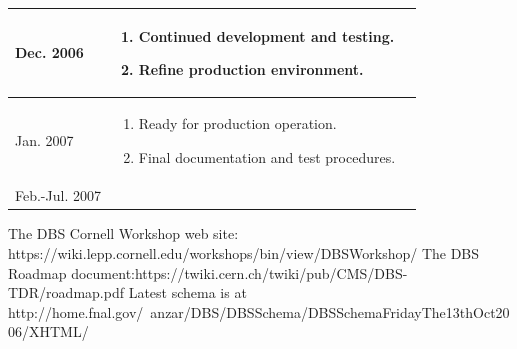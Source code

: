\documentclass{cmspaper}
\begin{document}
\begin{table}[htb]
\begin{center}
\begin{tabular}{|l|p{3.5in}|p{1.5in}|}
Dec. 2006      & \begin{enumerate} \item Continued development and testing. \item Refine production environment.   \end{enumerate} &  \\ \hline
Jan. 2007  & \begin{enumerate} \item Ready for production operation. \item Final documentation and test procedures. \end{enumerate}   &  \\ \hline
Feb.-Jul. 2007 &    &      \\ \hline
      \end{tabular}
    \end{center}
  \end{table}  



\begin{thebibliography}{9}
   {The DBS Cornell Workshop web site: https://wiki.lepp.cornell.edu/workshops/bin/view/DBSWorkshop/}
   {The DBS Roadmap document:https://twiki.cern.ch/twiki/pub/CMS/DBS-TDR/roadmap.pdf}
   {Latest schema is at http://home.fnal.gov/~anzar/DBS/DBSSchema/DBSSchemaFridayThe13thOct2006/XHTML/}

\end{thebibliography}
\end{document}

